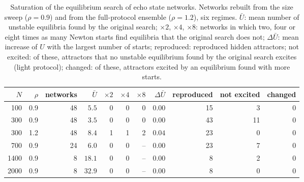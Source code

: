 \begin{table}
\caption{Saturation of the equilibrium search of echo state networks. Networks rebuilt from the size sweep ($\rho=0.9$) and
from the full-protocol ensemble ($\rho=1.2$), six regimes. $\bar U$: mean number of unstable equilibria found by the original
search; $\times2$, $\times4$, $\times8$: networks in which two, four or eight times as many Newton starts find equilibria
that the original search does not; $\Delta\bar U$: mean increase of $U$ with the largest number of starts; reproduced: reproduced
hidden attractors; not excited: of these, attractors that no unstable equilibrium found by the original search excites
(light protocol); changed: of these, attractors excited by an equilibrium found with more starts.}
\label{tab:sm_sat}
\begin{ruledtabular}
\begin{tabular}{rrrrrrrrrrr}
$N$ & $\rho$ & networks & $\bar U$ & $\times2$ & $\times4$ & $\times8$ & $\Delta\bar U$ & reproduced & not excited & changed \\
\hline
100 & 0.9 & 48 & $5.5$ & 0 & 0 & 0 & $0.00$ & 15 & 3 & 0 \\
300 & 0.9 & 48 & $3.5$ & 0 & 0 & 0 & $0.00$ & 43 & 11 & 0 \\
300 & 1.2 & 48 & $8.4$ & 1 & 1 & 2 & $0.04$ & 23 & 0 & 0 \\
700 & 0.9 & 24 & $6.0$ & 0 & 0 & -- & $0.00$ & 23 & 7 & 0 \\
1400 & 0.9 & 8 & $18.1$ & 0 & 0 & -- & $0.00$ & 8 & 2 & 0 \\
2000 & 0.9 & 8 & $32.9$ & 0 & 0 & -- & $0.00$ & 8 & 0 & 0 \\
\end{tabular}
\end{ruledtabular}
\end{table}
